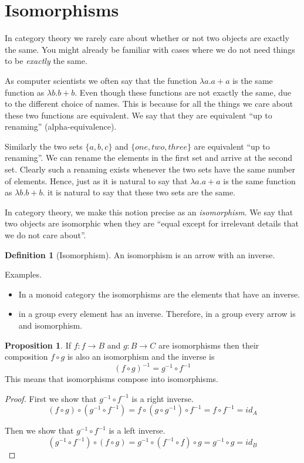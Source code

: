 \documentclass{book}
\theoremstyle{definition}
\newtheorem{definition}{Definition}[section]
\newtheorem{proposition}{Proposition}
\begin{document}
\section{Isomorphisms}

In category theory we rarely care about whether or not two objects are exactly the same.
You might already be familiar with cases where we do not need things to be \emph{exactly} the same.

As computer scientists we often say that the function $\lambda a. a + a$ is the same function as $\lambda b. b + b$.
Even though these functions are not exactly the same, due to the different choice of names.
This is because for all the things we care about these two functions are equivalent.
We say that they are equivalent ``up to renaming'' (alpha-equivalence).

Similarly the two sets $\{ a, b, c \}$ and $\{ one, two, three \}$ are equivalent ``up to renaming''.
We can rename the elements in the first set and arrive at the second set.
Clearly such a renaming exists whenever the two sets have the same number of elements.
Hence, just as it is natural to say that $\lambda a. a + a$ is the same function as $\lambda b. b + b$.
it is natural to say that these two sets are the same.

In category theory, we make this notion precise as an \emph{isomorphism}.
We say that two objects are isomorphic when they are ``equal except for irrelevant details that we do not care about''.

\begin{definition}[Isomorphism]
  An isomorphism is an arrow with an inverse.
\end{definition}

Examples.
\begin{itemize}
  \item In a monoid category the isomorphisms are the elements that have an inverse.
  \item in a group every element has an inverse. Therefore, in a group every
    arrow is and isomorphism.
\end{itemize}

\begin{proposition}
  If $f : f \to B$ and $g : B \to C$ are isomorphisms then their composition
  $f \circ g$ is also an isomorphism and the inverse is
  \[
    (f \circ g)^{-1} = g^{-1} \circ f^{-1}
  \]
  This means that isomorphisms compose into isomorphisms.
\end{proposition}
\begin{proof}
  First we show that $g^{-1} \circ f^{-1}$ is a right inverse.
  \[ (f \circ g) \circ (g^{-1} \circ f^{-1}) = f \circ (g \circ g^{-1}) \circ
    f^{-1} = f \circ f^{-1} = id_A \]

  Then we show that $g^{-1} \circ f^{-1}$ is a left inverse.
  \[ (g^{-1} \circ f^{-1}) \circ (f \circ g) = g^{-1} \circ (f^{-1} \circ f)
    \circ g = g^{-1} \circ g = id_B\]
\end{proof}
\end{document}
